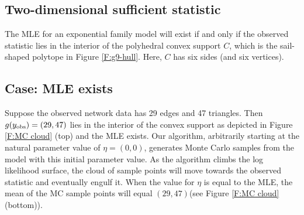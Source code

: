 
\subsection{Two-dimensional sufficient statistic}\label{S:example 2dim}
The MLE for an exponential family model will exist if and only if the observed 
statistic lies in the interior of the polyhedral convex support $C$, which is the sail-shaped polytope in Figure \ref{F:g9-hull}. Here, $C$ has six sides (and six vertices).

\subsection{Case: MLE exists}
Suppose the observed network data has 29 edges and 47 triangles.  Then $g(y_{\textrm{obs}}) = (29,47)$
lies in the interior of the convex support as depicted in Figure \ref{F:MC cloud} 
(top) and the MLE exists.
Our algorithm, arbitrarily starting at the natural parameter value of $\eta = (0,0)$, 
generates Monte Carlo samples from the model with this initial parameter value.  As 
the algorithm climbs the log likelihood surface, 
the cloud of sample points will move towards 
the observed statistic and eventually engulf it.  
When the value for $\eta$ is equal to the MLE, the mean of the MC sample points will 
equal $(29,47)$(see Figure \ref{F:MC cloud} (bottom)).  
